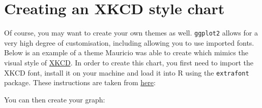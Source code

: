 \section{Creating an XKCD style
chart}\label{creating-an-xkcd-style-chart-6}

Of course, you may want to create your own themes as well.
\texttt{ggplot2} allows for a very high degree of customisation,
including allowing you to use imported fonts. Below is an example of a
theme Mauricio was able to create which mimics the visual style of
\href{http://xkcd.com/}{XKCD}. In order to create this chart, you first
need to import the XKCD font, install it on your machine and load it
into R using the \texttt{extrafont} package. These instructions are
taken from
\href{https://www.google.com.au/url?sa=t\&rct=j\&q=\&esrc=s\&source=web\&cd=1\&ved=0ahUKEwiWzafchdPJAhVBpJQKHe_LDT8QFggbMAA\&url=https\%3A\%2F\%2Fcran.r-project.org\%2Fweb\%2Fpackages\%2Fxkcd\%2Fvignettes\%2Fxkcd-intro.pdf\&usg=AFQjCNE-KciGY14e-Q1buYIVmTFC0ht__Q\&sig2=DZUwkvIHwfNWtTtkcz94jg}{here}:

\begin{Shaded}
\begin{Highlighting}[]

\NormalTok{(}\NormalTok{, }
\StringTok{      }\NormalTok{, }\NormalTok{)}
\NormalTok{(}\NormalTok{)}
\NormalTok{(}\NormalTok{)}
\NormalTok{(} \NormalTok{, }\NormalTok{)}
\NormalTok{()}
\NormalTok{()}
\end{Highlighting}
\end{Shaded}

You can then create your graph:

